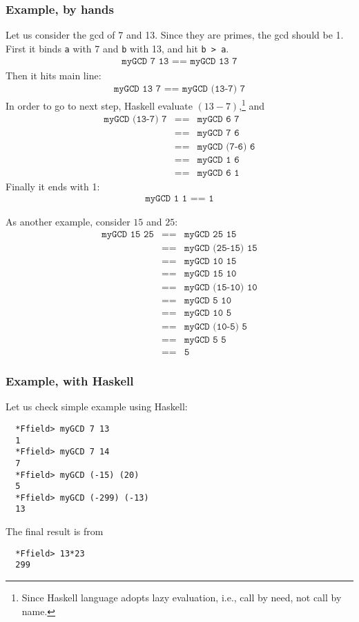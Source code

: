 \documentclass[11pt]{book}
\begin{document}
\subsubsection{Example, by hands}
Let us consider the gcd of 7 and 13.
Since they are primes, the gcd should be 1.
First it binds \texttt{a} with 7 and \texttt{b} with 13, and hit \texttt{b > a}.
\begin{eqnarray}
\texttt{myGCD 7 13 == myGCD 13 7}
\end{eqnarray}
Then it hits main line:
\begin{eqnarray}
\texttt{myGCD 13 7 == myGCD (13-7) 7}
\end{eqnarray}
In order to go to next step, Haskell evaluate $(13-7)$,\footnote{
Since Haskell language adopts lazy evaluation, i.e., call by need, not call by name.
}
and
\begin{eqnarray}
\texttt{myGCD (13-7) 7} &\texttt{==}& \texttt{myGCD 6 7} \\
&\texttt{==}& \texttt{myGCD 7 6} \\
&\texttt{==}& \texttt{myGCD (7-6) 6} \\
&\texttt{==}& \texttt{myGCD 1 6} \\
&\texttt{==}& \texttt{myGCD 6 1}
\end{eqnarray}
Finally it ends with 1:
\begin{eqnarray}
\texttt{myGCD 1 1 == 1} 
\end{eqnarray}

As another example, consider $15$ and $25$:
\begin{eqnarray}
\texttt{myGCD 15 25} &\texttt{==}& \texttt{myGCD 25 15}\\
&\texttt{==}& \texttt{myGCD (25-15) 15}\\
&\texttt{==}& \texttt{myGCD 10 15}\\
&\texttt{==}& \texttt{myGCD 15 10}\\
&\texttt{==}& \texttt{myGCD (15-10) 10}\\
&\texttt{==}& \texttt{myGCD 5 10}\\
&\texttt{==}& \texttt{myGCD 10 5}\\
&\texttt{==}& \texttt{myGCD (10-5) 5}\\
&\texttt{==}& \texttt{myGCD 5 5}\\
&\texttt{==}& \texttt{5}
\end{eqnarray}

\subsubsection{Example, with Haskell}
Let us check simple example using Haskell:
\begin{verbatim}
  *Ffield> myGCD 7 13
  1
  *Ffield> myGCD 7 14
  7
  *Ffield> myGCD (-15) (20)
  5
  *Ffield> myGCD (-299) (-13)
  13
\end{verbatim}
The final result is from
\begin{verbatim}
  *Ffield> 13*23
  299
\end{verbatim}
\end{document}
